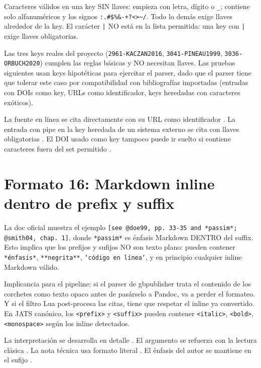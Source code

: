 Caracteres válidos en una key SIN llaves: empieza con letra, dígito o \texttt{\_}; contiene solo alfanuméricos y los signos \texttt{:.\#\$\%\&-+?<>\textasciitilde{}/}. Todo lo demás exige llaves alrededor de la key. El carácter \texttt{|} NO está en la lista permitida: una key con \texttt{|} exige llaves obligatorias.

Las tres keys reales del proyecto (\texttt{2961-KACZAN2016}, \texttt{3041-PINEAU1999}, \texttt{3036-ORBUCH2020}) cumplen las reglas básicas y NO necesitan llaves. Las pruebas siguientes usan keys hipotéticas para ejercitar el parser, dado que el parser tiene que tolerar este caso por compatibilidad con bibliografías importadas (entradas con DOIs como key, URLs como identificador, keys heredadas con caracteres exóticos).

La fuente en línea se cita directamente con su URL como identificador \autocite{https_www.pagina12.com.ar_}. La entrada con pipe en la key heredada de un sistema externo se cita con llaves obligatorias \autocite{2961-KACZAN2016_variante-extendida}. El DOI usado como key tampoco puede ir suelto si contiene caracteres fuera del set permitido \autocite{10.5821_ace.v4i12.2483}.


\section{Formato 16: Markdown inline dentro de prefix y suffix}
La doc oficial muestra el ejemplo \texttt{[see @doe99, pp. 33-35 and *passim*; @smith04, chap. 1]}, donde \texttt{*passim*} es énfasis Markdown DENTRO del suffix. Esto implica que los prefijos y sufijos NO son texto plano: pueden contener \texttt{*énfasis*}, \texttt{**negrita**}, \texttt{`código en línea`}, y en principio cualquier inline Markdown válido.

Implicancia para el pipeline: si el parser de gbpublisher trata el contenido de los corchetes como texto opaco antes de pasárselo a Pandoc, va a perder el formateo. Y si el filtro Lua post-procesa las citas, tiene que respetar el inline ya convertido. En JATS canónico, los \texttt{<prefix>} y \texttt{<suffix>} pueden contener \texttt{<italic>}, \texttt{<bold>}, \texttt{<monospace>} según los inline detectados.

La interpretación se desarrolla en detalle \autocite[ver especialmente][pp. 33-35 y \textit{passim}]{2961-KACZAN2016}. El argumento se refuerza con la lectura clásica \autocite[\textbf{comparar con}][cap. 3, \textit{muy especialmente}]{3041-PINEAU1999}. La nota técnica usa formato literal \autocite[ver \texttt{appendix-B.tex} para los datos crudos]{3036-ORBUCH2020}. El énfasis del autor se mantiene en el sufijo \autocite[\textit{cursivas del original}]{2961-KACZAN2016}.


